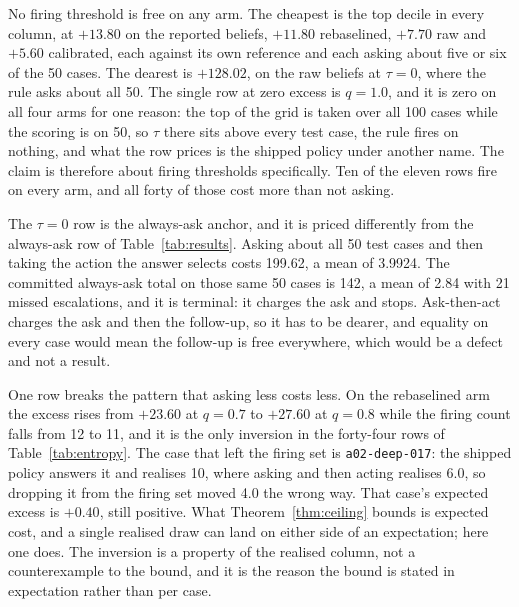 \documentclass{article}
\begin{document}
No firing threshold is free on any arm. The cheapest is the top decile in every
column, at $+13.80$ on the reported beliefs, $+11.80$ rebaselined, $+7.70$ raw and
$+5.60$ calibrated, each against its own reference and each asking about five or six
of the 50 cases. The dearest is $+128.02$, on the raw beliefs at $\tau = 0$, where
the rule asks about all 50. The single row at zero excess is $q = 1.0$, and it is
zero on all four arms for one reason: the top of the grid is taken over all 100
cases while the scoring is on 50, so $\tau$ there sits above every test case, the
rule fires on nothing, and what the row prices is the shipped policy under another
name. The claim is therefore about firing thresholds specifically. Ten of the eleven
rows fire on every arm, and all forty of those cost more than not asking.

The $\tau = 0$ row is the always-ask anchor, and it is priced differently from the
always-ask row of Table~\ref{tab:results}. Asking about all 50 test cases and then
taking the action the answer selects costs 199.62, a mean of 3.9924. The committed
always-ask total on those same 50 cases is 142, a mean of 2.84 with 21 missed
escalations, and it is terminal: it charges the ask and stops. Ask-then-act charges
the ask and then the follow-up, so it has to be dearer, and equality on every case
would mean the follow-up is free everywhere, which would be a defect and not a
result.

One row breaks the pattern that asking less costs less. On the rebaselined arm the
excess rises from $+23.60$ at $q = 0.7$ to $+27.60$ at $q = 0.8$ while the firing
count falls from 12 to 11, and it is the only inversion in the forty-four rows of
Table~\ref{tab:entropy}. The case that left the firing set is
\texttt{a02-deep-017}: the shipped policy answers it and realises 10, where asking
and then acting realises 6.0, so dropping it from the firing set moved 4.0 the wrong
way. That case's expected excess is $+0.40$, still positive. What
Theorem~\ref{thm:ceiling} bounds is expected cost, and a single realised draw can
land on either side of an expectation; here one does. The inversion is a property of
the realised column, not a counterexample to the bound, and it is the reason the
bound is stated in expectation rather than per case.
\end{document}
